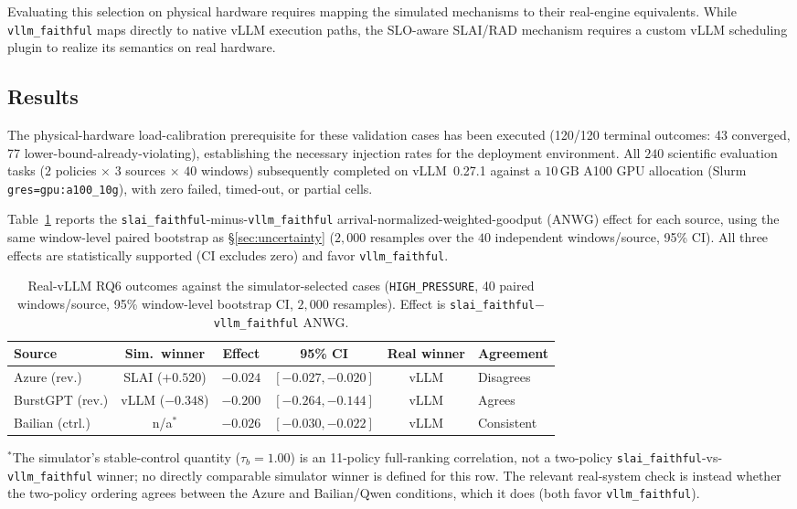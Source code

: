 \documentclass[sn-basic,Numbered,pdflatex]{sn-jnl}
\begin{document}
Evaluating this selection on physical hardware requires mapping the simulated mechanisms to their real-engine equivalents. While \texttt{vllm\_faithful} maps directly to native vLLM execution paths, the SLO-aware SLAI/RAD mechanism requires a custom vLLM scheduling plugin to realize its semantics on real hardware.

\subsection{Results}
\label{sec:real-system-result}

The physical-hardware load-calibration prerequisite for these validation cases has been executed (120/120 terminal outcomes: 43 converged, 77 lower-bound-already-violating), establishing the necessary injection rates for the deployment environment. All $240$ scientific evaluation tasks ($2$ policies $\times$ $3$ sources $\times$ $40$ windows) subsequently completed on vLLM~0.27.1 against a $10\,\mathrm{GB}$ A100 GPU allocation (Slurm \texttt{gres=gpu:a100\_10g}), with zero failed, timed-out, or partial cells.

Table~\ref{tab:rq6-results} reports the \texttt{slai\_faithful}-minus-\texttt{vllm\_faithful} arrival-normalized-weighted-goodput (ANWG) effect for each source, using the same window-level paired bootstrap as \S\ref{sec:uncertainty} ($2{,}000$ resamples over the $40$ independent windows/source, 95\% CI). All three effects are statistically supported (CI excludes zero) and favor \texttt{vllm\_faithful}.

\begin{table}[t]
\centering
\caption{Real-vLLM RQ6 outcomes against the simulator-selected cases (\texttt{HIGH\_PRESSURE}, 40 paired windows/source, 95\% window-level bootstrap CI, $2{,}000$ resamples). Effect is \texttt{slai\_faithful}$-$\texttt{vllm\_faithful} ANWG.}
\label{tab:rq6-results}
\small
\setlength{\tabcolsep}{4.5pt}
\begin{tabular}{lccccl}
\toprule
Source & Sim.\ winner & Effect & 95\% CI & Real winner & Agreement \\
\midrule
Azure (rev.) & SLAI ($+0.520$) & $-0.024$ & $[-0.027,-0.020]$ & vLLM & Disagrees \\
BurstGPT (rev.) & vLLM ($-0.348$) & $-0.200$ & $[-0.264,-0.144]$ & vLLM & Agrees \\
Bailian (ctrl.) & n/a$^{*}$ & $-0.026$ & $[-0.030,-0.022]$ & vLLM & Consistent \\
\bottomrule
\end{tabular}
\vspace{2pt}

{\footnotesize $^{*}$The simulator's stable-control quantity ($\tau_b = 1.00$) is an
11-policy full-ranking correlation, not a two-policy \texttt{slai\_faithful}-vs-\texttt{vllm\_faithful}
winner; no directly comparable simulator winner is defined for this row. The
relevant real-system check is instead whether the two-policy ordering agrees
between the Azure and Bailian/Qwen conditions, which it does (both favor
\texttt{vllm\_faithful}).}
\end{table}
\end{document}
